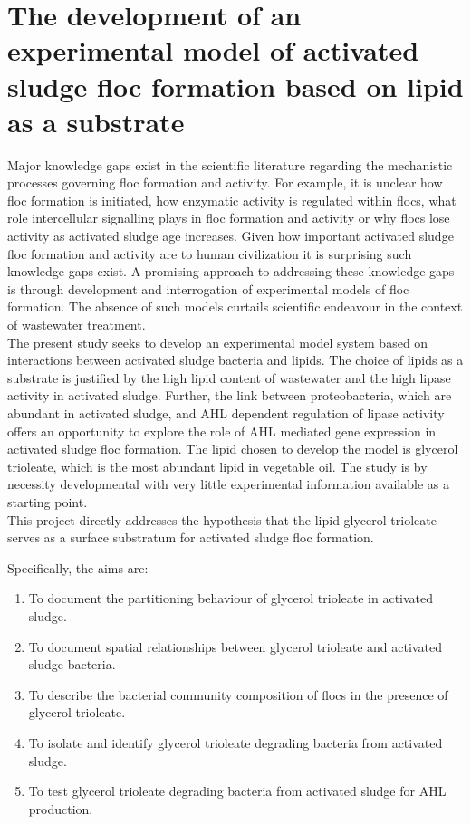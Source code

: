 \documentclass[twoside]{article}
\begin{document}
\section{The development of an experimental model of activated sludge floc formation based on lipid as a substrate}
\thispagestyle{plain}
Major knowledge gaps exist in the scientific literature regarding the mechanistic processes governing floc formation and activity. For example, it is unclear how floc formation is initiated, how enzymatic activity is regulated within flocs, what role intercellular signalling plays in floc formation and activity or why flocs lose activity as activated sludge age increases. Given how important activated sludge floc formation and activity are to human civilization it is surprising such knowledge gaps exist. A promising approach to addressing these knowledge gaps is through development and interrogation of experimental models of floc formation. The absence of such models curtails scientific endeavour in the context of wastewater treatment.  \\

The present study seeks to develop an experimental model system based on interactions between activated sludge bacteria and lipids. The choice of lipids as a substrate is justified by the high lipid content of wastewater and the high lipase activity in activated sludge. Further, the link between proteobacteria, which are abundant in activated sludge, and AHL dependent regulation of lipase activity offers an opportunity to explore the role of AHL mediated gene expression in activated sludge floc formation. The lipid chosen to develop the model is glycerol trioleate, which is the most abundant lipid in vegetable oil. The study is by necessity developmental with very little experimental information available as a starting point.\\

This project directly addresses the hypothesis that the lipid glycerol trioleate serves as a surface substratum for activated sludge floc formation. 


Specifically, the aims are:
\begin{enumerate}
\item To document the partitioning behaviour of glycerol trioleate in activated sludge.
\item To document spatial relationships between glycerol trioleate and activated sludge bacteria.
\item To describe the bacterial community composition of flocs in the presence of glycerol trioleate.
\item To isolate and identify glycerol trioleate degrading bacteria from activated sludge.

\item To test glycerol trioleate degrading bacteria from activated sludge for AHL production.
\end{enumerate}
\newpage
\end{document}

